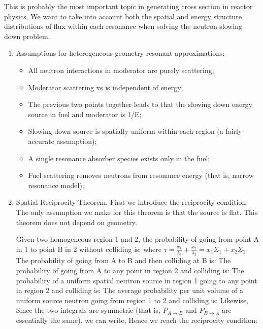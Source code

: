 \documentclass{school-22.211-notes}
\date{March  5, 2012}
\begin{document}
\maketitle

\clearpage
{}
This is probably the most important topic in generating cross section in reactor physics. We want to take into account both the spatial and energy structure distributions of flux within each resonance when solving the neutron slowing down problem. 

\begin{enumerate}
\item Assumptions for heterogeneous geometry resonant approximations:
\begin{itemize}
\item All neutron interactions in moderator are purely scattering;
\item Moderator scattering xs is independent of energy;
\item The previous two points together leads to that the slowing down energy source in fuel and moderator is 1/E;
\item Slowing down source is spatially uniform within each region (a fairly accurate assumption);
\item A single resonance absorber species exists only in the fuel;
\item Fuel scattering removes neutrons from resonance energy (that is, narrow resonance model); 
\end{itemize}

\item Spatial Reciprocity Theorem. First we introduce the reciprocity condition. The only assumption we make for this theorem is that the source is flat. This theorem does not depend on geometry. 

Given two homogeneous region 1 and 2, the probability of going from point A in 1 to point B in 2 without colliding is:
where $\tau = \frac{x_1}{\lambda_1} + \frac{x_2}{\lambda_2} = x_1 \Sigma_1 + x_2 \Sigma_2$. The probability of going from A to B and then colliding at B is: 
The probability of going from A to any point in region 2 and colliding is:
The probability of a uniform spatial neutron source in region 1 going to any point in region 2 and colliding is:
The average probability per unit volume of a uniform source neutron going from region 1 to 2 and colliding is:
Likewise,
Since the two integrals are symmetric (that is, $P_{A\to B}$ and $P_{B \to A}$ are essentially the same), we can write,
Hence we reach the reciprocity condition:


\end{enumerate}
\end{document}
